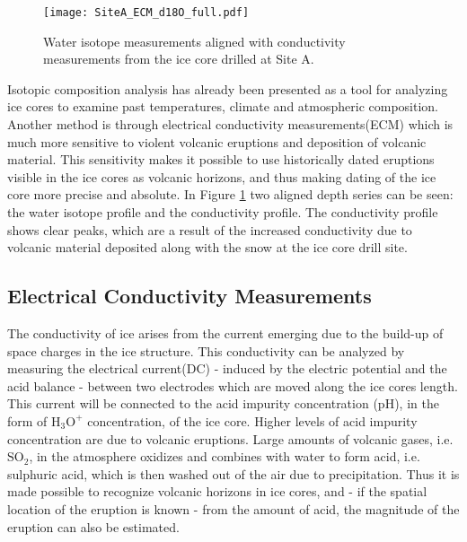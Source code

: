 \documentclass[../../CompleteThesis2/Complete_2ndDraft]{subfiles}
\begin{document}
\begin{figure}[h]
	\centering
	\texttt{[image: SiteA\_ECM\_d18O\_full.pdf]}
	\caption[Conductivity and $\delta^{18}$O measurements from Site A.]{\small Water isotope measurements aligned with conductivity measurements from the ice core drilled at Site A.}
	\label{Fig:ICE_SiteA_ECM_d18O_full}
\end{figure}

Isotopic composition analysis has already been presented as a tool for analyzing ice cores to examine past temperatures, climate and atmospheric composition. Another method is through electrical conductivity measurements(ECM) which is much more sensitive to violent volcanic eruptions and deposition of volcanic material. This sensitivity makes it possible to use historically dated eruptions visible in the ice cores as volcanic horizons, and thus making dating of the ice core more precise and absolute. In Figure \ref{Fig:ICE_SiteA_ECM_d18O_full} two aligned depth series can be seen: the water isotope profile and the conductivity profile. The conductivity profile shows clear peaks, which are a result of the increased conductivity due to volcanic material deposited along with the snow at the ice core drill site.


\subsection[ECM][ECM]{Electrical Conductivity Measurements}
\label{Sec:Ice_ECMandDEP_ECM}


The conductivity of ice arises from the current emerging due to the build-up of space charges in the ice structure. This conductivity can be analyzed by measuring the electrical current(DC) - induced by the electric potential and the acid balance - between two electrodes which are moved along the ice cores length. This current will be connected to the acid impurity concentration (pH), in the form of $\text{H}_3\text{O}^+$ concentration, of the ice core. Higher levels of acid impurity concentration are due to volcanic eruptions. Large amounts of volcanic gases, i.e. $\text{SO}_2$, in the atmosphere oxidizes and combines with water to form acid, i.e. sulphuric acid, which is then washed out of the air due to precipitation. Thus it is made possible to recognize volcanic horizons in ice cores, and - if the spatial location of the eruption is known - from the amount of acid, the magnitude of the eruption can also be estimated.

\end{document}
